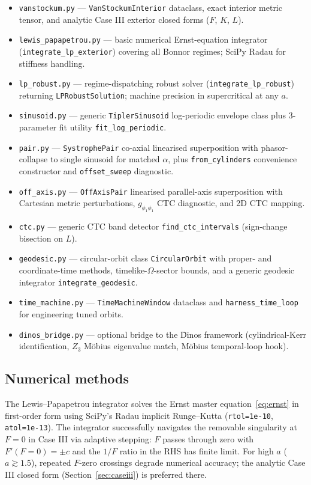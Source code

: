 \documentclass[11pt,a4paper]{article}
\begin{document}
\begin{itemize}[leftmargin=*]
\item \texttt{vanstockum.py} --- \texttt{VanStockumInterior} dataclass,
exact interior metric tensor, and analytic Case III exterior closed
forms ($F$, $K$, $L$).
\item \texttt{lewis\_papapetrou.py} --- basic numerical Ernst-equation
integrator (\texttt{integrate\_lp\_exterior}) covering all Bonnor
regimes; SciPy Radau for stiffness handling.
\item \texttt{lp\_robust.py} --- regime-dispatching robust solver
(\texttt{integrate\_lp\_robust}) returning \texttt{LPRobustSolution};
machine precision in supercritical at any $a$.
\item \texttt{sinusoid.py} --- generic \texttt{TiplerSinusoid}
log-periodic envelope class plus $3$-parameter fit utility
\texttt{fit\_log\_periodic}.
\item \texttt{pair.py} --- \texttt{SystrophePair} co-axial linearised
superposition with phasor-collapse to single sinusoid for matched
$\alpha$, plus \texttt{from\_cylinders} convenience constructor and
\texttt{offset\_sweep} diagnostic.
\item \texttt{off\_axis.py} --- \texttt{OffAxisPair} linearised
parallel-axis superposition with Cartesian metric perturbations,
$g_{\phi_1\phi_1}$ CTC diagnostic, and 2D CTC mapping.
\item \texttt{ctc.py} --- generic CTC band detector
\texttt{find\_ctc\_intervals} (sign-change bisection on $L$).
\item \texttt{geodesic.py} --- circular-orbit class
\texttt{CircularOrbit} with proper- and coordinate-time methods,
timelike-$\Omega$-sector bounds, and a generic geodesic integrator
\texttt{integrate\_geodesic}.
\item \texttt{time\_machine.py} --- \texttt{TimeMachineWindow} dataclass
and \texttt{harness\_time\_loop} for engineering tuned orbits.
\item \texttt{dinos\_bridge.py} --- optional bridge to the \=Dinos
framework (cylindrical-Kerr identification, $Z_3$ M\"obius eigenvalue
match, M\"obius temporal-loop hook).
\end{itemize}

\subsection{Numerical methods}

The Lewis--Papapetrou integrator solves the Ernst master
equation~\eqref{eq:ernst} in first-order form using SciPy's Radau
implicit Runge--Kutta (\texttt{rtol=1e-10}, \texttt{atol=1e-13}). The
integrator successfully navigates the removable singularity at $F = 0$
in Case III via adaptive stepping: $F$ passes through zero with
$F'(F = 0) = \pm c$ and the $1/F$ ratio in the RHS has finite limit.
For high $a$ ($a \gtrsim 1.5$), repeated $F$-zero crossings degrade
numerical accuracy; the analytic Case III closed form
(Section~\ref{sec:caseiii}) is preferred there.
\end{document}
